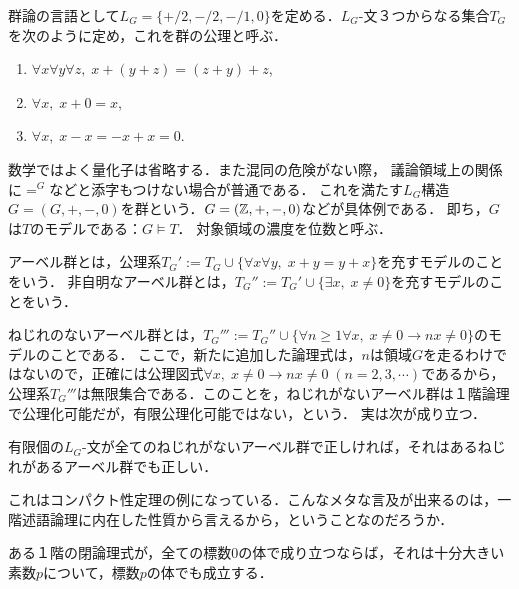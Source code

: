 \documentclass[uplatex, dvipdfmx]{jsreport}
\begin{document}
\begin{example}[群論]
    群論の言語として$L_G=\{+/2,-/2,-/1,0\}$を定める．$L_G$-文３つからなる集合$T_G$を次のように定め，これを群の公理と呼ぶ．
    \begin{enumerate}
        \item $\forall x\forall y\forall z,\;x+(y+z)=(z+y)+z$,
        \item $\forall x,\; x+0=x$,
        \item $\forall x,\; x-x=-x+x=0$.
    \end{enumerate}
    数学ではよく量化子は省略する．また混同の危険がない際，
    議論領域上の関係に$=^G$などと添字もつけない場合が普通である．
    これを満たす$L_G$構造$G=(G,+,-,0)$を群という．$G=(\mathbb{Z},+,-,0)$などが具体例である．
    即ち，$G$は$T$のモデルである：$G \vDash T$．
    対象領域の濃度を位数と呼ぶ．

    アーベル群とは，公理系$T_G':=T_G\cup\{\forall x\forall y,\;x+y=y+x\}$を充すモデルのことをいう．
    非自明なアーベル群とは，$T_G'':=T_G'\cup\{\exists x,\;x\ne 0\}$を充すモデルのことをいう．

    ねじれのないアーベル群とは，$T_G''':=T_G''\cup\{\forall n\ge 1\forall x,\; x\ne 0\rightarrow nx\ne 0\}$のモデルのことである．
    ここで，新たに追加した論理式は，$n$は領域$G$を走るわけではないので，正確には公理図式$\forall x,\; x\ne 0\rightarrow nx\ne 0\;(n=2,3,\cdots)$であるから，
    公理系$T_G'''$は無限集合である．このことを，ねじれがないアーベル群は１階論理で公理化可能だが，有限公理化可能ではない，という．
    実は次が成り立つ．
    \begin{proposition}[Compactness]
        有限個の$L_G$-文が全てのねじれがないアーベル群で正しければ，それはあるねじれがあるアーベル群でも正しい．
    \end{proposition}
    \begin{remark}
        これはコンパクト性定理の例になっている．こんなメタな言及が出来るのは，一階述語論理に内在した性質から言えるから，ということなのだろうか．
    \end{remark}
\end{example}

\begin{example}[体]
    \begin{proposition}[Compactness]
        ある１階の閉論理式が，全ての標数$0$の体で成り立つならば，それは十分大きい素数$p$について，標数$p$の体でも成立する．
    \end{proposition}
\end{example}
\end{document}

